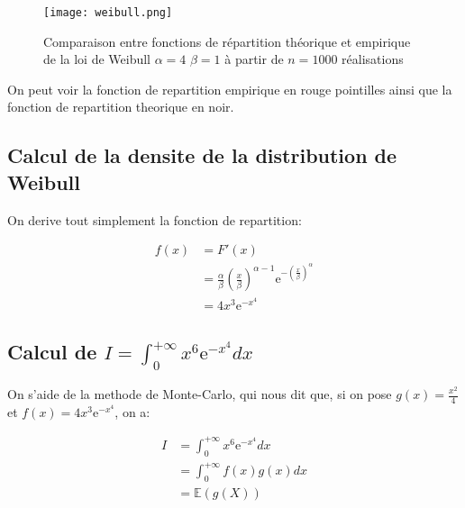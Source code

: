 \documentclass{article}
\begin{document}
\begin{multicols}{2}
\begin{figure}[H]
    \begin{center}
        \texttt{[image: weibull.png]}
        \centering
        \captionsetup{justification=centering}
        \caption{\label{fig:weibull}Comparaison entre fonctions de répartition théorique et empirique de la loi de Weibull $\alpha = 4$ $\beta = 1$ à partir de $n = 1000$ réalisations}
    \end{center}
\end{figure}

On peut voir la fonction de repartition empirique en rouge pointilles ainsi que
la fonction de repartition theorique en noir.

\subsection{Calcul de la densite de la distribution de Weibull}\label{subsec:ex12}

On derive tout simplement la fonction de repartition:

\begin{equation}
    \begin{split}
        f(x) &= F'(x) \\
             &= \frac{\alpha}{\beta}\left(\frac{x}{\beta}\right)^{\alpha - 1}\mathrm{e}^{-\left(\frac{x}{\beta}\right)^{\alpha}} \\
             &= 4 x^3 \mathrm{e}^{-x^4}
    \end{split}
\end{equation}

\subsection{Calcul de $I = \int_0^{+\infty} x^6 \mathrm{e}^{-x^4} dx$}\label{subsec:ex13}

On s'aide de la methode de Monte-Carlo, qui nous dit que, si on pose
$g(x) = \frac{x^2}{4}$ et $f(x) = 4 x^3 \mathrm{e}^{-x^4}$, on a:

\begin{equation}
    \begin{split}
        I &= \int_0^{+\infty} x^6 \mathrm{e}^{-x^4} dx \\
          &= \int_0^{+\infty} f(x) g(x) dx \\
          &= \mathbb{E}(g(X))
    \end{split}
\end{equation}


\end{multicols}
\end{document}

